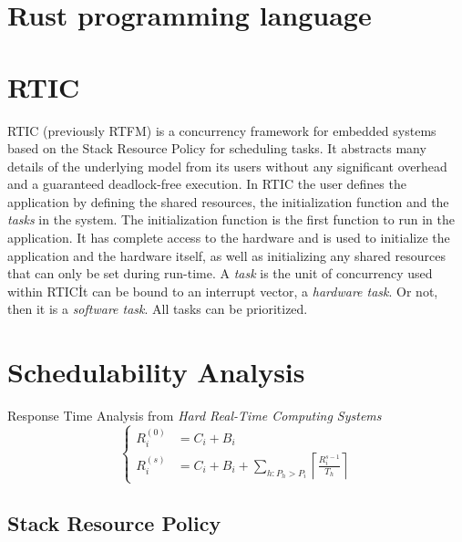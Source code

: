 \section{Rust programming language}

\section{RTIC}
RTIC (previously RTFM\cite{rtfm}) is a concurrency framework for embedded
systems based on the Stack Resource Policy\cite{srp} for scheduling tasks. It
abstracts many details of the underlying model from its users without any
significant overhead and a guaranteed deadlock-free execution. In RTIC the
user defines the application by defining the shared resources, the
initialization function and the \emph{tasks} in the system. The initialization
function is the first function to run in the application. It has complete
access to the hardware and is used to initialize the application and the
hardware itself, as well as initializing any shared resources that can only be
set during run-time. A \emph{task} is the unit of concurrency used within 
RTIC\. It can be bound to an interrupt vector, a \emph{hardware task}. Or not,
then it is a \emph{software task}. All tasks can be prioritized.

\section{Schedulability Analysis}
Response Time Analysis from \textit{Hard Real-Time Computing Systems}\cite{hardrealtimecomputingsystems}
\begin{equation}
    \begin{cases}
        R_{i}^{(0)} &= C_i + B_i \\
        R_{i}^{(s)} &= C_i + B_i + \sum\limits_{h: P_h > P_i} \left\lceil \frac{R_{i}^{s-1}}{T_h} \right\rceil
    \end{cases}
\end{equation}
\subsection{Stack Resource Policy}


